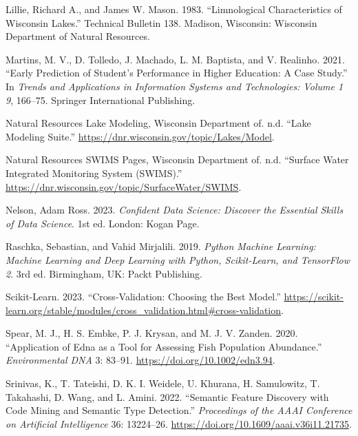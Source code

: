 \documentclass[
]{article}
\newlength{\cslhangindent}
\newenvironment{CSLReferences}[2] %
 {\begin{list}{}{%
  \setlength{\itemindent}{0pt}
  \setlength{\leftmargin}{0pt}
  \setlength{\parsep}{0pt}
  \ifodd #1
   \setlength{\leftmargin}{\cslhangindent}
   \setlength{\itemindent}{-1\cslhangindent}
  \fi
  \setlength{\itemsep}{#2\baselineskip}}}
 {\end{list}}
\begin{document}
\begin{CSLReferences}{1}{0}
Lillie, Richard A., and James W. Mason. 1983. {``Limnological
Characteristics of Wisconsin Lakes.''} Technical Bulletin 138. Madison,
Wisconsin: Wisconsin Department of Natural Resources.

Martins, M. V., D. Tolledo, J. Machado, L. M. Baptista, and V. Realinho.
2021. {``Early Prediction of Student's Performance in Higher Education:
A Case Study.''} In \emph{Trends and Applications in Information Systems
and Technologies: Volume 1 9}, 166--75. Springer International
Publishing.

Natural Resources Lake Modeling, Wisconsin Department of. n.d. {``Lake
Modeling Suite.''} \url{https://dnr.wisconsin.gov/topic/Lakes/Model}.

Natural Resources SWIMS Pages, Wisconsin Department of. n.d. {``Surface
Water Integrated Monitoring System (SWIMS).''}
\url{https://dnr.wisconsin.gov/topic/SurfaceWater/SWIMS}.

Nelson, Adam Ross. 2023. \emph{Confident Data Science: Discover the
Essential Skills of Data Science}. 1st ed. London: Kogan Page.

Raschka, Sebastian, and Vahid Mirjalili. 2019. \emph{Python Machine
Learning: Machine Learning and Deep Learning with Python, Scikit-Learn,
and TensorFlow 2}. 3rd ed. Birmingham, UK: Packt Publishing.

Scikit-Learn. 2023. {``Cross-Validation: Choosing the Best Model.''}
\url{https://scikit-learn.org/stable/modules/cross_validation.html\#cross-validation}.

Spear, M. J., H. S. Embke, P. J. Krysan, and M. J. V. Zanden. 2020.
{``Application of Edna as a Tool for Assessing Fish Population
Abundance.''} \emph{Environmental DNA} 3: 83--91.
\url{https://doi.org/10.1002/edn3.94}.

Srinivas, K., T. Tateishi, D. K. I. Weidele, U. Khurana, H. Samulowitz,
T. Takahashi, D. Wang, and L. Amini. 2022. {``Semantic Feature Discovery
with Code Mining and Semantic Type Detection.''} \emph{Proceedings of
the AAAI Conference on Artificial Intelligence} 36: 13224--26.
\url{https://doi.org/10.1609/aaai.v36i11.21735}.


\end{CSLReferences}
\end{document}
